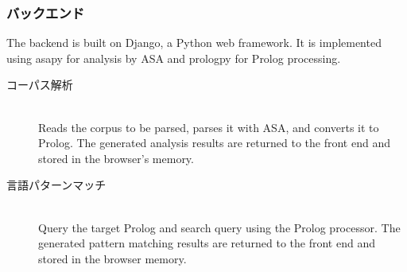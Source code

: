 \subsubsection{バックエンド}
The backend is built on Django, a Python web framework. It is implemented using asapy for analysis by ASA and prologpy for Prolog processing.
\label{sec:2-1-2}
\begin{description}
\item[コーパス解析]\mbox{}\\
Reads the corpus to be parsed, parses it with ASA, and converts it to Prolog.
The generated analysis results are returned to the front end and stored in the browser's memory.
\item[言語パターンマッチ]\mbox{}\\
Query the target Prolog and search query using the Prolog processor.
The generated pattern matching results are returned to the front end and stored in the browser memory.
\end{description}


